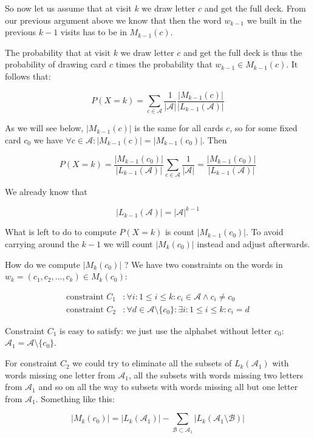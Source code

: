 So now let us assume that at visit $k$ we draw letter $c$ and get the full deck. From our previous argument above we know that then the word $w_{k-1}$ we built in the previous $k-1$ visits has to be in $M_{k-1}(c)$.


The probability that at visit $k$ we draw letter $c$ and get the full deck is thus the probability of drawing card $c$ times the probability that $w_{k-1} \in M_{k-1}(c)$. It follows that:

$$
P(X=k) = \sum_{c \in \mathcal{A}} \frac{1}{|\mathcal{A}|} \frac{|M_{k-1}(c)|}{|L_{k-1}(\mathcal{A})|}
$$

As we will see below, $|M_{k-1}(c)|$ is the same for all cards $c$, so for some fixed card $c_0$ we have $\forall c \in \mathcal{A}: |M_{k-1}(c)| = |M_{k-1}(c_0)|$. Then

$$
P(X=k) = \frac{|M_{k-1}(c_0)|}{|L_{k-1}(\mathcal{A})|} \sum_{c \in \mathcal{A}} \frac{1}{|\mathcal{A}|} = \frac{|M_{k-1}(c_0)|}{|L_{k-1}(\mathcal{A})|}
$$

We already know that 

$$
|L_{k-1}(\mathcal{A})| = |\mathcal{A}|^{k-1}
$$

What is left to do to compute $P(X=k)$ is count $|M_{k-1}(c_0)|$. To avoid carrying around the $k-1$ we will count $|M_k(c_0)|$ instead and adjust afterwards.

How do we compute $|M_k(c_0)|$ ? We have two constraints on the words in $w_k=(c_1, c_2, \ldots, c_k) \in M_k(c_0)$:

\begin{align*}
\text{constraint } C_1 &: \forall i: 1 \leq i \leq k: c_i \in \mathcal{A} \wedge c_i \neq c_0 \\
\text{constraint } C_2 &: \forall d \in \mathcal{A} \setminus \{c_0\}: \exists i: 1 \leq i \leq k: c_i = d
\end{align*}

Constraint $C_1$ is easy to satisfy: we just use the alphabet without letter $c_0$: $\mathcal{A}_1 = \mathcal{A} \setminus \{c_0\}$.

For constraint $C_2$ we could try to eliminate all the subsets of $L_{k}(\mathcal{A}_1)$ with words missing one letter from $\mathcal{A}_1$, all the subsets with words missing two letters from $\mathcal{A}_1$ and so on all the way to subsets with words missing all but one letter from $\mathcal{A}_1$. Something like this:

$$
|M_k(c_0)| = |L_k(\mathcal{A}_1)| - \sum_{\mathcal{B} \subset \mathcal{A}_1} |L_k(\mathcal{A}_1 \setminus \mathcal{B})|
$$

